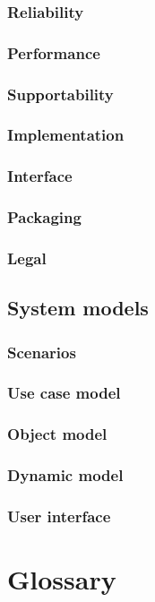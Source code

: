 \documentclass{article}
\begin{document}
		\subsubsection{Reliability}
		\subsubsection{Performance}
		\subsubsection{Supportability}
		\subsubsection{Implementation}
		\subsubsection{Interface}
		\subsubsection{Packaging}
		\subsubsection{Legal}
	\subsection{System models}
		\subsubsection{Scenarios}
			
				

			
				
			
		\subsubsection{Use case model}
			
		\subsubsection{Object model}
		\subsubsection{Dynamic model}
		\subsubsection{User interface}
\section{Glossary}
\end{document}

